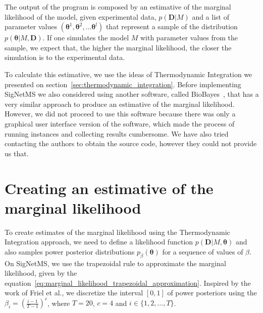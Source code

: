 The output of the program is composed by an estimative of the marginal
likelihood of the model, given experimental data, $p({\bm D} | M)$ and a
list of parameter values $({\bm \theta}^1, {\bm \theta}^2, \ldots {\bm
\theta}^l)$ that represent a sample of the distribution $p({\bm \theta}
| M, {\bm D})$. If one simulates the model $M$ with parameter values
from the sample, we expect that, the higher the marginal likelihood, the
closer the simulation is to the experimental data.

To calculate this estimative, we use the ideas of Thermodynamic
Integration we presented on section~\ref{sec:thermodynamic_integration}.
Before implementing SigNetMS we also considered using another software,
called BioBayes~\cite{Vyshemirsky2008}, that has a very similar approach
to produce an estimative of the marginal likelihood. However, we did not
proceed to use this software because there was only a graphical user
interface version of the software, which made the process of running
instances and collecting results cumbersome. We have also tried
contacting the authors to obtain the source code, however they could not
provide us that.

\section{Creating an estimative of the marginal likelihood}


To create estimates of the marginal likelihood using the Thermodynamic
Integration approach, we need to define a likelihood function $p({\bm
D}| M, {\bm \theta})$ and also samples power posterior distributions
$p_\beta({\bm \theta})$ for a sequence of values of $\beta$. On
SigNetMS, we use the trapezoidal rule to approximate the marginal
likelihood, given by the
equation~\ref{eq:marginal_likelihood_trapezoidal_approximation}. 
Inspired by the work of Friel et al., we discretize the
interval $[0, 1]$ of power posteriors using the $\beta_i =
\left(\frac{i - 1}{T - 1}\right)^c$, where $T = 20$, $c = 4$ and $i \in
\{1, 2, \ldots, T\}$.

